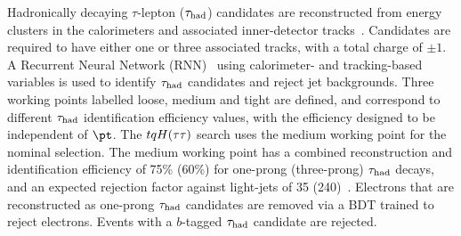 \documentclass[PAPER, coverpage, atlasdraft=true, texlive=2016, UKenglish]{\ATLASLATEXPATH atlasdoc} %
\begin{document}
Hadronically decaying $\tau$-lepton ($\tau_{\mathrm{had}}$) candidates are reconstructed from energy clusters in the calorimeters and
associated inner-detector tracks~\cite{ATL-PHYS-PUB-2019-033}. %
Candidates are required to have either one or three associated tracks,
with a total charge of $\pm 1$.
A Recurrent Neural Network (RNN)~\cite{Graves:2012SCI}
using calorimeter- and tracking-based variables is used to identify $\tau_{\mathrm{had}}$ candidates and reject jet backgrounds.
Three working points labelled loose, medium and tight are defined, and correspond to different $\tau_{\mathrm{had}}$ identification efficiency values, with the efficiency designed to be independent of $\pt$. The $tqH(\tau\tau)$ search uses the medium
working point for the nominal selection.
The medium working point has a combined reconstruction and identification efficiency of 75\% (60\%) for one-prong (three-prong) $\tau_{\mathrm{had}}$ 
decays, and an expected rejection factor against light-jets of 35 (240)~\cite{ATL-PHYS-PUB-2019-033}. 
Electrons that are reconstructed as one-prong $\tau_{\mathrm{had}}$ candidates are removed via a BDT trained to reject electrons.
Events with a $b$-tagged $\tau_{\mathrm{had}}$ candidate are rejected.
\end{document}
